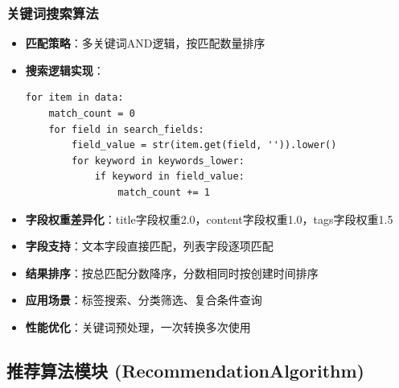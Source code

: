 \documentclass[12pt,a4paper]{article}
\begin{document}
\subsubsection{关键词搜索算法}
\begin{itemize}
    \item \textbf{匹配策略}：多关键词AND逻辑，按匹配数量排序
    \item \textbf{搜索逻辑实现}：
    \begin{verbatim}
for item in data:
    match_count = 0
    for field in search_fields:
        field_value = str(item.get(field, '')).lower()
        for keyword in keywords_lower:
            if keyword in field_value:
                match_count += 1
    \end{verbatim}
    \item \textbf{字段权重差异化}：title字段权重2.0，content字段权重1.0，tags字段权重1.5
    \item \textbf{字段支持}：文本字段直接匹配，列表字段逐项匹配
    \item \textbf{结果排序}：按总匹配分数降序，分数相同时按创建时间排序
    \item \textbf{应用场景}：标签搜索、分类筛选、复合条件查询
    \item \textbf{性能优化}：关键词预处理，一次转换多次使用
\end{itemize}

\subsection{推荐算法模块 (RecommendationAlgorithm)}
\end{document}
